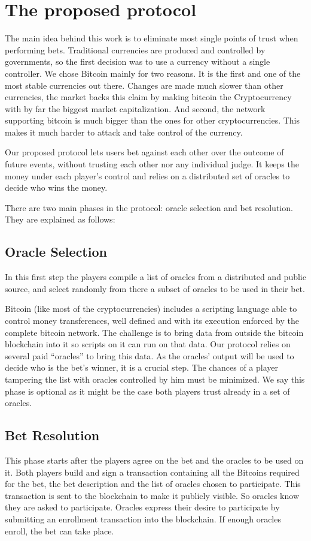 \section{The proposed protocol}

The main idea behind this work is to eliminate most single points of
  trust when performing bets.
Traditional currencies are produced and controlled by governments, so the first
  decision was to use a currency without a single controller.
We chose Bitcoin mainly for two reasons.
It is the first and one of the most stable currencies out there.
Changes are made much slower than other currencies, the market backs this claim
  by making bitcoin the Cryptocurrency with by far the biggest market
  capitalization.
And second, the network supporting bitcoin is much bigger than the ones for
  other cryptocurrencies. This makes it much harder to attack and take control
  of the currency.

Our proposed protocol lets users bet against each other over the outcome of
  future events, without trusting each other nor any individual judge.
It keeps the money under each player's control and relies on a distributed set
  of oracles to decide who wins the money.

There are two main phases in the protocol: oracle selection and bet
  resolution. They are explained as follows:

\subsection{Oracle Selection}
In this first step the players compile a list of oracles from a distributed
  and public source, and select randomly from there a subset of oracles to
  be used in their bet.

Bitcoin (like most of the cryptocurrencies) includes a scripting language able
 to control money transferences, well defined and with its execution enforced by
 the complete bitcoin network.
The challenge is to bring data from outside the bitcoin blockchain into it so
  scripts on it can run on that data.
Our protocol relies on several paid ``oracles'' to bring this data.
As the oracles' output will be used to decide who is the bet's winner, it is a
  crucial step.
The chances of a player tampering the list with oracles controlled by him must
  be minimized.
We say this phase is optional as it might be the case both players trust already
  in a set of oracles.

\subsection{Bet Resolution}
This phase starts after the players agree on the bet and the oracles to be used
  on it.
Both players build and sign a transaction containing all the Bitcoins required
  for the bet, the bet description and the list of oracles chosen to
  participate.
This transaction is sent to the blockchain to make it publicly visible. So
  oracles know they are asked to participate.
Oracles express their desire to participate by submitting an enrollment
  transaction into the blockchain.
If enough oracles enroll, the bet can take place.

